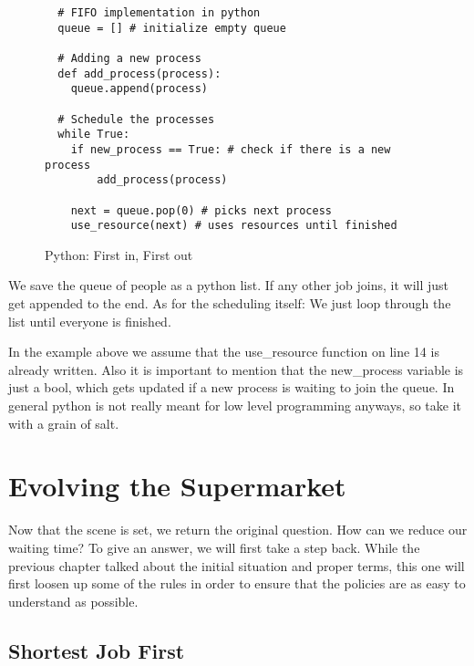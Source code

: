 \begin{figure}[h]
\begin{verbatim}
  # FIFO implementation in python
  queue = [] # initialize empty queue

  # Adding a new process
  def add_process(process):
    queue.append(process)

  # Schedule the processes
  while True:
    if new_process == True: # check if there is a new process
        add_process(process)
    
    next = queue.pop(0) # picks next process
    use_resource(next) # uses resources until finished
\end{verbatim}
\caption{Python: First in, First out}
\label{code:fifo}
\end{figure}

We save the queue of people as a python list.
If any other job joins, it will just get appended to the end.
As for the scheduling itself:
We just loop through the list until everyone is finished.


In the example above we assume that the use\_resource function on line 14 is already written.
Also it is important to mention that the new\_process variable is just a bool, which gets updated if a new process is waiting to join the queue.
In general python is not really meant for low level programming anyways, so take it with a grain of salt.


\section{Evolving the Supermarket}

Now that the scene is set, we return the original question. 
How can we reduce our waiting time?
To give an answer, we will first take a step back.
While the previous chapter talked about the initial situation and proper terms, this one will first loosen up some of the rules in order to ensure that the policies are as easy to understand as possible.

\subsection{Shortest Job First}

